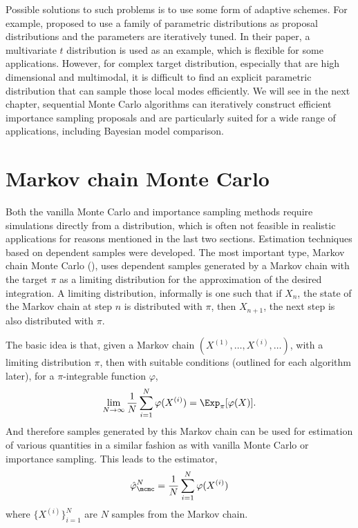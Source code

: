 Possible solutions to such problems is to use some form of adaptive schemes.
For example, \cite{ManSuk:1992vx} proposed to use a family of parametric
distributions as proposal distributions and the parameters are iteratively
tuned. In their paper, a multivariate $t$ distribution is used as an example,
which is flexible for some applications. However, for complex target
distribution, especially that are high dimensional and multimodal, it is
difficult to find an explicit parametric distribution that can sample those
local modes efficiently. We will see in the next chapter, sequential Monte
Carlo algorithms can iteratively construct efficient importance sampling
proposals and are particularly suited for a wide range of applications,
including Bayesian model comparison.

\section{Markov chain Monte Carlo}
\label{sec:Markov chain Monte Carlo}

Both the vanilla Monte Carlo and importance sampling methods require
simulations directly from a distribution, which is often not feasible in
realistic applications for reasons mentioned in the last two sections.
Estimation techniques based on dependent samples were developed. The most
important type, Markov chain Monte Carlo (\mcmc), uses dependent samples
generated by a Markov chain with the target $\pi$ as a limiting distribution
for the approximation of the desired integration. A limiting distribution,
informally is one such that if $X_n$, the state of the Markov chain at step
$n$ is distributed with $\pi$, then $X_{n+1}$, the next step is also
distributed with $\pi$.

The basic idea is that, given a Markov chain $(X^{(1)},\dots,X^{(i)},\dots)$,
with a limiting distribution $\pi$, then with suitable conditions (outlined
for each algorithm later), for a $\pi$-integrable function $\varphi$,
\begin{equation}
  \lim_{N\to\infty}\frac{1}{N}\sum_{i=1}^N\varphi(X^{(i)}) =
  \Exp_{\pi}[\varphi(X)].
  \label{eq:mcmc convergence}
\end{equation}
And therefore samples generated by this Markov chain can be used for
estimation of various quantities in a similar fashion as with vanilla Monte
Carlo or importance sampling. This leads to the estimator,
\begin{equation}
  \hat\varphi_{\mcmc}^N = \frac{1}{N}\sum_{i=1}^N\varphi(X^{(i)})
  \label{eq:mcmc est}
\end{equation}
where $\{X^{(i)}\}_{i=1}^N$ are $N$ samples from the Markov chain.

